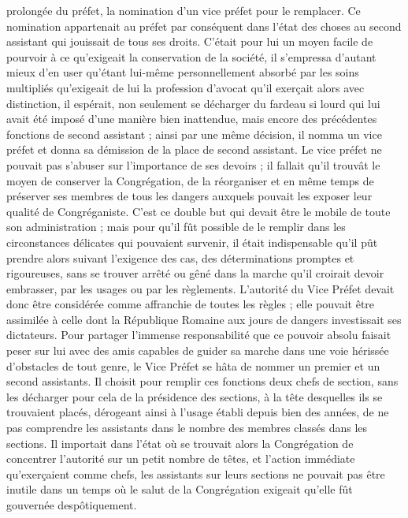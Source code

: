 prolongée du préfet, la nomination d'un vice préfet pour le remplacer. Ce nomination appartenait au préfet par conséquent dans l'état des choses au second assistant qui jouissait de tous ses droits. C'était pour lui un moyen facile de pourvoir à ce qu'exigeait la conservation de la société, il s'empressa d'autant mieux d'en user qu'étant lui-même personnellement absorbé par les soins multipliés qu'exigeait de lui la profession d'avocat qu'il exerçait alors avec distinction, il espérait, non seulement se décharger du fardeau si lourd qui lui avait été imposé d'une manière bien inattendue, mais encore des précédentes fonctions de second assistant ; ainsi par une même décision, il nomma un vice préfet et donna sa démission de la place de second assistant. Le vice préfet ne pouvait pas s'abuser sur l'importance de ses devoirs ; il fallait qu'il trouvât le moyen de conserver la Congrégation, de la réorganiser et en même temps de préserver ses membres de tous les dangers auxquels pouvait les exposer leur qualité de Congréganiste. C'est ce double but qui devait être le mobile de toute son administration ; mais pour qu'il fût possible de le remplir dans les circonstances délicates qui pouvaient survenir, il était indispensable qu'il pût prendre alors suivant l'exigence des cas, des déterminations promptes et rigoureuses, sans se trouver arrêté ou gêné dans la marche qu'il croirait devoir embrasser, par les usages ou par les règlements. L'autorité du Vice Préfet devait donc être considérée comme affranchie de toutes les règles ; elle pouvait être assimilée à celle dont la République Romaine aux jours de dangers investissait ses dictateurs. Pour partager l'immense responsabilité que ce pouvoir absolu faisait peser sur lui avec des amis capables de guider sa marche dans une voie hérissée d'obstacles de tout genre,
le Vice Préfet se hâta de nommer un premier et un second assistants. Il choisit pour remplir ces fonctions deux chefs de section, sans les décharger pour cela de la présidence des sections, à la tête desquelles ils se trouvaient placés, dérogeant ainsi à l’usage établi depuis bien des années, de ne pas comprendre les assistants dans le nombre des membres classés dans les sections. Il importait dans l'état où se trouvait alors la Congrégation de concentrer l'autorité sur un petit nombre de têtes, et l'action immédiate qu'exerçaient comme chefs, les assistants sur leurs sections ne pouvait pas être inutile dans un temps où le salut de la Congrégation exigeait qu'elle fût gouvernée despôtiquement.

